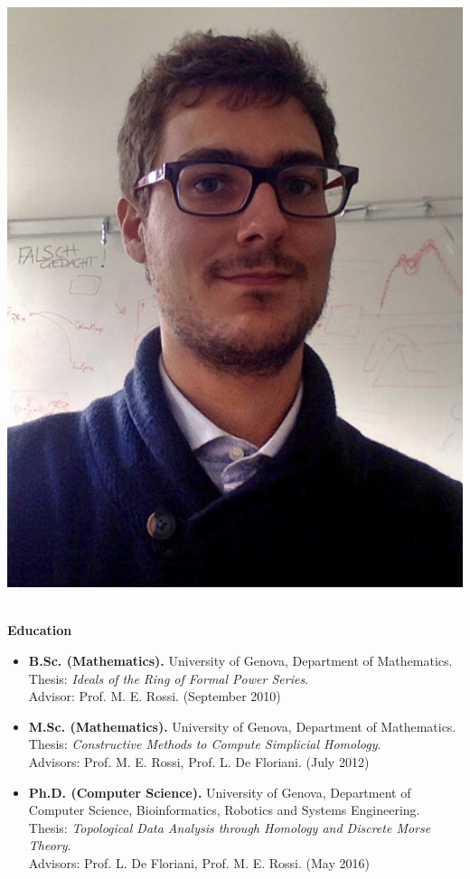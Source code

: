 \documentclass[11pt]{article}
\begin{document}
 \begin{minipage}{.30\textwidth}
\centering
\vspace{-14px}
      \includegraphics[width=.63\textwidth]{PhotoCV}
      \end{minipage}\\


\noindent
{\Large\bf Education}
\noindent

\begin{itemize}

\item {\bf B.Sc. (Mathematics).} University of Genova, Department of Mathematics. \\Thesis: {\em Ideals of the Ring of Formal Power Series}. \\Advisor: Prof. M. E. Rossi. (September 2010)

\item {\bf M.Sc. (Mathematics).} University of Genova, Department of Mathematics. \\Thesis: {\em Constructive Methods to Compute Simplicial Homology}. \\Advisors: Prof. M. E. Rossi, Prof. L. De Floriani. (July 2012)

\item {\bf Ph.D. (Computer Science).} University of Genova, Department of Computer Science, Bioinformatics, Robotics and Systems Engineering. \\Thesis: {\em Topological Data Analysis through Homology and Discrete Morse Theory}. \\Advisors: Prof. L. De Floriani, Prof. M. E. Rossi. (May 2016)
\end{itemize}
\end{document}
